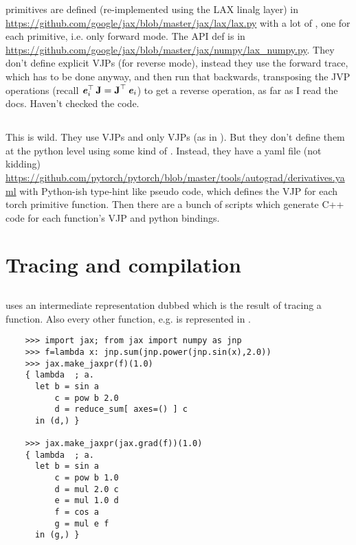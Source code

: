 \documentclass[paper=a4,11pt,headsepline]{scrartcl}
\begin{document}
\numpy primitives are defined (re-implemented using the LAX linalg layer) in
\url{https://github.com/google/jax/blob/master/jax/lax/lax.py} with a lot of
, one for each primitive, i.e. only forward mode. The \numpy API
def is in
\url{https://github.com/google/jax/blob/master/jax/numpy/lax_numpy.py}. They
don't define explicit VJPs (for reverse mode), instead they use the forward
trace, which has to be done anyway, and then run that backwards, transposing
the JVP operations (recall $\bm{\mathit{e}}_i^\top\,\bm{\mathbf{J}} = \bm{\mathbf{J}}^\top\,\bm{\mathit{e}}_i$) to get
a reverse operation, as far as I read the docs. Haven't checked the code.

\subsection{\pytorch}

This is wild. They use VJPs and only VJPs (as in \autograd). But they don't
define them at the python level using some kind of . Instead, they
have a yaml file (not kidding)
\url{https://github.com/pytorch/pytorch/blob/master/tools/autograd/derivatives.yaml}
with Python-ish type-hint like pseudo code, which defines the VJP for each
torch primitive function. Then there are a bunch of scripts which generate C++
code for each function's VJP and python bindings.


\section{Tracing and compilation}

\subsection{\jax}

\jax uses an intermediate representation
dubbed  which is the result of tracing a function. Also every
other function, e.g.  is represented in .

\begin{verbatim}
    >>> import jax; from jax import numpy as jnp
    >>> f=lambda x: jnp.sum(jnp.power(jnp.sin(x),2.0))
    >>> jax.make_jaxpr(f)(1.0)
    { lambda  ; a.
      let b = sin a
          c = pow b 2.0
          d = reduce_sum[ axes=() ] c
      in (d,) }

    >>> jax.make_jaxpr(jax.grad(f))(1.0)
    { lambda  ; a.
      let b = sin a
          c = pow b 1.0
          d = mul 2.0 c
          e = mul 1.0 d
          f = cos a
          g = mul e f
      in (g,) }
\end{verbatim}
\end{document}
